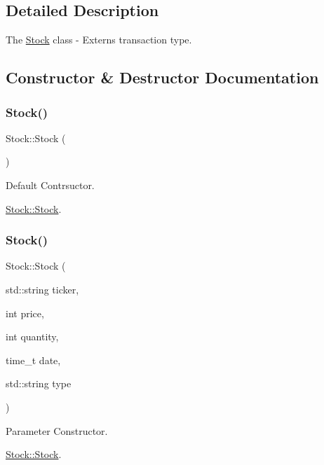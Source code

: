 \subsection{Detailed Description}
The \mbox{\hyperlink{class_stock}{Stock}} class -\/ Externs transaction type. 

\subsection{Constructor \& Destructor Documentation}
\mbox{\label{class_stock_adddc4282213b3174a4299cca5a30117c}} 
\subsubsection{\texorpdfstring{Stock()}{Stock()}\hspace{0.1cm}{\footnotesize\ttfamily [1/2]}}
{\footnotesize\ttfamily Stock\+::\+Stock (\begin{DoxyParamCaption}{ }\end{DoxyParamCaption})}



Default Contrsuctor. 

\mbox{\hyperlink{class_stock_adddc4282213b3174a4299cca5a30117c}{Stock\+::\+Stock}}. \mbox{\label{class_stock_a91ae0fdc8b4b70446d328dbec96f043d}} 
\subsubsection{\texorpdfstring{Stock()}{Stock()}\hspace{0.1cm}{\footnotesize\ttfamily [2/2]}}
{\footnotesize\ttfamily Stock\+::\+Stock (\begin{DoxyParamCaption}\item[{std\+::string}]{ticker,  }\item[{int}]{price,  }\item[{int}]{quantity,  }\item[{time\+\_\+t}]{date,  }\item[{std\+::string}]{type }\end{DoxyParamCaption})}



Parameter Constructor. 

\mbox{\hyperlink{class_stock_adddc4282213b3174a4299cca5a30117c}{Stock\+::\+Stock}}.


